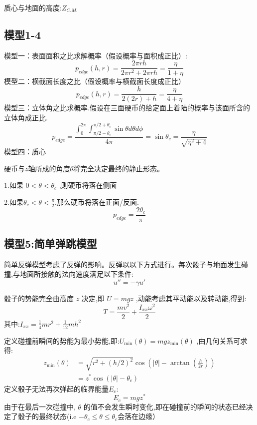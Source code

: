 \documentclass[UTF8]{gapd}
\begin{document}
质心与地面的高度:\quad$Z_{C.M.}$

\subsection{模型1-4}
模型一：表面面积之比求解概率（假设概率与面积成正比）:
\begin{equation}
{p_{edge}}(h,r) = \frac{{2\pi rh}}{{2\pi {r^2} + 2\pi rh}} = \frac{\eta }{{1 + \eta }}
\end{equation}
模型二：横截面长度之比（假设概率与横截面长度成正比）
\begin{equation}
{p_{edge}}(h,r) = \frac{h}{{2(2r) + h}} = \frac{\eta }{{4 + \eta }}
\end{equation}
模型三：立体角之比求概率.假设在三面硬币的给定面上着陆的概率与该面所含的立体角成正比.
\begin{equation}
p_{edge}=\frac{\int_0^{2\pi}{\int_{\pi /2-\theta _c}^{\pi /2+\theta _c}{\sin \theta d\theta d\phi}}}{4\pi}=\sin \theta _c=\frac{\eta}{\sqrt{\eta ^2+4}}
\end{equation}
模型四：质心

硬币与$z$轴所成的角度$\theta$将完全决定最终的静止形态。

1.如果      $0<\theta<\theta_{c}$           ,则硬币将落在侧面

2.如果$\theta_{c}<\theta<\frac{\pi}{2}$,那么硬币将落在正面/反面.
\begin{equation}
{p_{edge}} = \frac{2\theta _c}{\pi}
\end{equation}

\subsection{模型5:简单弹跳模型}
简单反弹模型考虑了反弹的影响。反弹以以下方式进行。每次骰子与地面发生碰撞,与地面所接触的法向速度满足以下条件:
\begin{equation}
u''=-\gamma u'
\end{equation}


骰子的势能完全由高度 $z$ 决定,即  $U=mgz$             ,动能考虑其平动能以及转动能,得到:
\begin{equation}
T=\frac{m v^{2}}{2}+\frac{I_{x x} \omega^{2}}{2}
\end{equation}
其中:$I_{xx}=\frac{1}{4}mr^2+\frac{1}{12}mh^2$

定义碰撞前瞬间的势能为最小势能,即:$U_{\min}\left( \theta \right) =mgz_{\min}\left( \theta \right) $             ,由几何关系可求得:
\begin{equation}
\begin{aligned}
z_{\min }(\theta) &=\sqrt{r^{2}+(h / 2)^{2}} \cos \left(|\theta|-\arctan \left(\frac{h}{2 r}\right)\right) \\
&=z^{*} \cos \left(|\theta|-\theta_{c}\right)
\end{aligned}
\end{equation}
定义骰子无法再次弹起的临界能量$E_{c}$:
\begin{equation}
E_{c}=mgz^*
\end{equation}
由于在最后一次碰撞中, $\theta$   的值不会发生瞬时变化,即在碰撞前的瞬间的状态已经决定了骰子的最终状态(i.e $-\theta _c\leqslant \theta \leqslant \theta _c$会落在边缘）
\end{document}
